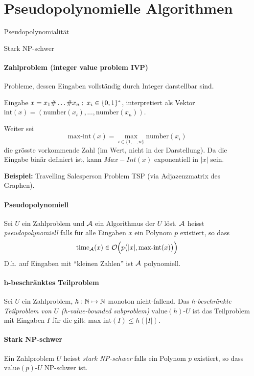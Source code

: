 \section{Pseudopolynomielle Algorithmen}

\begin{takeaway}
    \item Pseudopolynomialität
    \item Stark NP-schwer
\end{takeaway}

\paragraph{Zahlproblem (integer value problem IVP)} 
Probleme, dessen Eingaben vollständig durch Integer darstellbar sind.

Eingabe $x = x_1 \# \dots \# x_n \; ; \; x_i \in \lbrace 0, 1 \rbrace^*$, interpretiert 
als Vektor $\text{int}(x) = (\text{number}(x_i), \dots, \text{number}(x_n))$.

Weiter sei 
\[\text{max-int}(x) = \max_{i \in \{1, ..., n\}} \text{number}(x_i)\]
die grösste vorkommende Zahl (im Wert, nicht in der Darstellung). Da die 
Eingabe binär definiert ist, kann $Max-Int(x)$ exponentiell in $|x|$ sein.

\textbf{Beispiel:} Travelling Salesperson Problem TSP (via Adjazenzmatrix des Graphen).

\paragraph{Pseudopolynomiell}
Sei $U$ ein Zahlproblem und $\mathcal{A}$ ein Algorithmus der $U$ löst.
$\mathcal{A}$ heisst \emph{pseudopolynomiell} falls für alle Eingaben $x$ ein 
Polynom $p$ existiert, so dass 
\[ \text{time}_{\mathcal{A}} (x) \in \mathcal{O} \Big( p \big( |x| , \text{max-int}(x) \big) \Big)\]
D.h. auf Eingaben mit ``kleinen Zahlen'' ist $\mathcal{A}$ polynomiell.

\paragraph{h-beschränktes Teilproblem}
Sei $U$ ein Zahlproblem, $h: \mathbb{N} \mapsto \mathbb{N}$ monoton nicht-fallend.
Das \emph{h-beschränkte Teilproblem von $U$ (h-value-bounded subproblem)} 
$\text{value}(h)\text{-}U$ ist das Teilproblem mit Eingaben $I$ für 
die gilt: $\text{max-int}(I) \leq h(|I|)$.

\paragraph{Stark NP-schwer}
Ein Zahlproblem $U$ heisst \emph{stark NP-schwer} falls ein Polynom $p$ existiert, 
so dass $\text{value}(p)\text{-}U$ NP-schwer ist.

